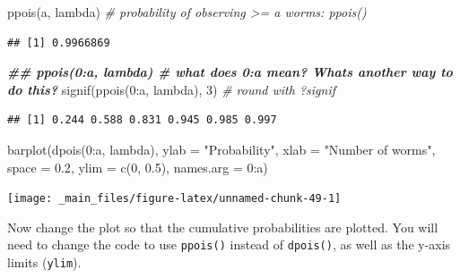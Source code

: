 \documentclass[
  11pt,
  a4paper,
]{book}
\newenvironment{Shaded}{\begin{snugshade}}{\end{snugshade}}
\newcommand{\AttributeTok}[1]{\textcolor[rgb]{0.77,0.63,0.00}{#1}}
\newcommand{\CommentTok}[1]{\textcolor[rgb]{0.56,0.35,0.01}{\textit{#1}}}
\newcommand{\DecValTok}[1]{\textcolor[rgb]{0.00,0.00,0.81}{#1}}
\newcommand{\DocumentationTok}[1]{\textcolor[rgb]{0.56,0.35,0.01}{\textbf{\textit{#1}}}}
\newcommand{\FloatTok}[1]{\textcolor[rgb]{0.00,0.00,0.81}{#1}}
\newcommand{\FunctionTok}[1]{\textcolor[rgb]{0.00,0.00,0.00}{#1}}
\newcommand{\NormalTok}[1]{#1}
\newcommand{\OtherTok}[1]{\textcolor[rgb]{0.56,0.35,0.01}{#1}}
\newcommand{\SpecialCharTok}[1]{\textcolor[rgb]{0.00,0.00,0.00}{#1}}
\newcommand{\StringTok}[1]{\textcolor[rgb]{0.31,0.60,0.02}{#1}}
\begin{document}
\begin{Shaded}
\begin{Highlighting}[]
\FunctionTok{ppois}\NormalTok{(a, lambda) }\CommentTok{\# probability of observing \textgreater{}= \textquotesingle{}a\textquotesingle{} worms: ppois()}
\end{Highlighting}
\end{Shaded}

\begin{verbatim}
## [1] 0.9966869
\end{verbatim}

\begin{Shaded}
\begin{Highlighting}[]
\DocumentationTok{\#\# ppois(0:a, lambda) \# what does 0:a mean? What\textquotesingle{}s another way to do this?}
\FunctionTok{signif}\NormalTok{(}\FunctionTok{ppois}\NormalTok{(}\DecValTok{0}\SpecialCharTok{:}\NormalTok{a, lambda), }\DecValTok{3}\NormalTok{) }\CommentTok{\# round with ?signif}
\end{Highlighting}
\end{Shaded}

\begin{verbatim}
## [1] 0.244 0.588 0.831 0.945 0.985 0.997
\end{verbatim}

\begin{Shaded}
\begin{Highlighting}[]
\FunctionTok{barplot}\NormalTok{(}\FunctionTok{dpois}\NormalTok{(}\DecValTok{0}\SpecialCharTok{:}\NormalTok{a, lambda),}
        \AttributeTok{ylab =} \StringTok{"Probability"}\NormalTok{, }\AttributeTok{xlab =} \StringTok{"Number of worms"}\NormalTok{,}
        \AttributeTok{space =} \FloatTok{0.2}\NormalTok{, }\AttributeTok{ylim =} \FunctionTok{c}\NormalTok{(}\DecValTok{0}\NormalTok{, }\FloatTok{0.5}\NormalTok{), }\AttributeTok{names.arg =} \DecValTok{0}\SpecialCharTok{:}\NormalTok{a)}
\end{Highlighting}
\end{Shaded}

\begin{center}\texttt{[image: \_main\_files/figure-latex/unnamed-chunk-49-1]} \end{center}

Now change the plot so that the cumulative probabilities are plotted. You will need to change the code to use \texttt{ppois()} instead of \texttt{dpois()}, as well as the y-axis limits (\texttt{ylim}).

\begin{Shaded}
\end{Shaded}
\end{document}
